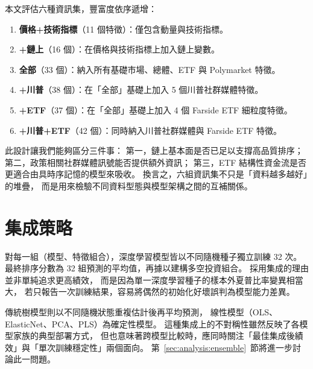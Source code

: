 本文評估六種資訊集，豐富度依序遞增：

\begin{enumerate}
  \item \textbf{價格+技術指標}（11 個特徵）：僅包含動量與技術指標。
  \item \textbf{+鏈上}（16 個）：在價格與技術指標上加入鏈上變數。
  \item \textbf{全部}（33 個）：納入所有基礎市場、總體、ETF 與 Polymarket 特徵。
  \item \textbf{+川普}（38 個）：在「全部」基礎上加入 5 個川普社群媒體特徵。
  \item \textbf{+ETF}（37 個）：在「全部」基礎上加入 4 個 Farside ETF 細粒度特徵。
  \item \textbf{+川普+ETF}（42 個）：同時納入川普社群媒體與 Farside ETF 特徵。
\end{enumerate}

此設計讓我們能夠區分三件事：
第一，鏈上基本面是否已足以支撐高品質排序；
第二，政策相關社群媒體訊號能否提供額外資訊；
第三，ETF 結構性資金流是否更適合由具時序記憶的模型來吸收。
換言之，六組資訊集不只是「資料越多越好」的堆疊，
而是用來檢驗不同資料型態與模型架構之間的互補關係。

\section{集成策略}

對每一組（模型、特徵組合），深度學習模型皆以不同隨機種子獨立訓練 32 次。
最終排序分數為 32 組預測的平均值，再據以建構多空投資組合。
採用集成的理由並非單純追求更高績效，
而是因為單一深度學習種子的樣本外夏普比率變異相當大，
若只報告一次訓練結果，容易將偶然的初始化好壞誤判為模型能力差異。

傳統樹模型則以不同隨機狀態重複估計後再平均預測，
線性模型（OLS、ElasticNet、PCA、PLS）為確定性模型。
這種集成上的不對稱性雖然反映了各模型家族的典型部署方式，
但也意味著跨模型比較時，應同時關注「最佳集成後績效」與「單次訓練穩定性」兩個面向。
第~\ref{sec:analysis:ensemble}~節將進一步討論此一問題。
